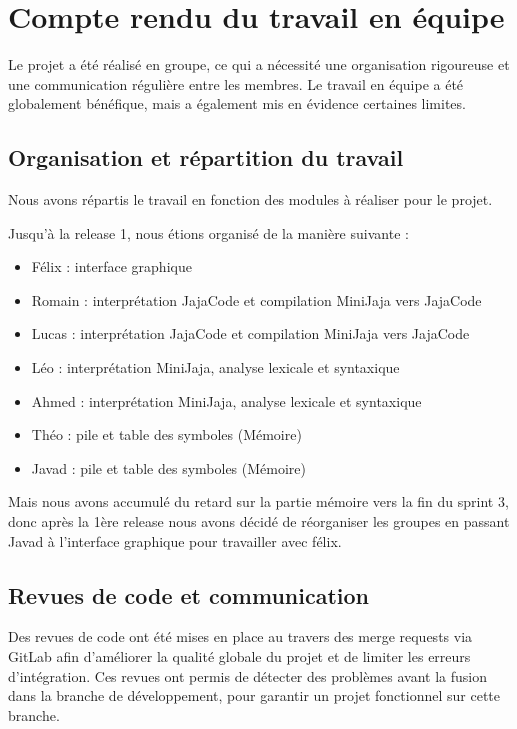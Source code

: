 
\section{Compte rendu du travail en équipe}

Le projet a été réalisé en groupe, ce qui a nécessité une organisation rigoureuse et une communication régulière entre les membres. Le travail en équipe a été globalement bénéfique, mais a également mis en évidence certaines limites.

\subsection{Organisation et répartition du travail}

Nous avons répartis le travail en fonction des modules à réaliser pour le projet.

Jusqu'à la release 1, nous étions organisé de la manière suivante :
\begin{itemize}
    \item Félix : interface graphique
    \item Romain : interprétation JajaCode et compilation MiniJaja vers JajaCode
    \item Lucas : interprétation JajaCode et compilation MiniJaja vers JajaCode
    \item Léo : interprétation MiniJaja, analyse lexicale et syntaxique
    \item Ahmed : interprétation MiniJaja, analyse lexicale et syntaxique
    \item Théo : pile et table des symboles (Mémoire)
    \item Javad : pile et table des symboles (Mémoire)
\end{itemize}
\vspace{0.5cm}
Mais nous avons accumulé du retard sur la partie mémoire vers la fin du sprint 3, donc après la 1ère release nous avons décidé de réorganiser les groupes
en passant Javad à l'interface graphique pour travailler avec félix.



\subsection{Revues de code et communication}

Des revues de code ont été mises en place au travers des merge requests via GitLab afin d’améliorer la qualité globale du projet et de limiter les erreurs d’intégration.
Ces revues ont permis de détecter des problèmes avant la fusion dans la branche de développement, pour garantir un projet fonctionnel sur cette branche.
\vspace{0.5cm}


